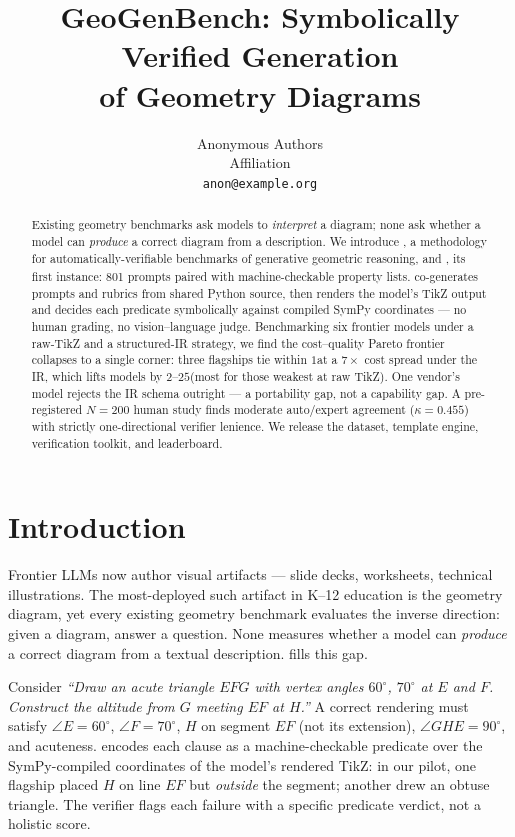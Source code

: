 \documentclass{article}
\title{GeoGenBench: Symbolically Verified Generation \\ of Geometry Diagrams}
\author{%
  Anonymous Authors\\
  Affiliation\\
  \texttt{anon@example.org}
}
\begin{document}
\maketitle

\begin{abstract}
Existing geometry benchmarks ask models to \emph{interpret} a diagram; none ask whether a model can \emph{produce} a correct diagram from a description.
We introduce \textbf{\GeoGen}, a methodology for automatically-verifiable benchmarks of generative geometric reasoning, and \textbf{\GeoGenBench}, its first instance: 801 prompts paired with machine-checkable property lists.
\GeoGen co-generates prompts and rubrics from shared Python source, then renders the model's TikZ output and decides each predicate symbolically against compiled SymPy coordinates --- no human grading, no vision--language judge.
Benchmarking six frontier models under a raw-TikZ and a structured-IR strategy, we find the cost--quality Pareto frontier collapses to a single corner: three flagships tie within $1$\pp at a $7\times$ cost spread under the IR, which lifts models by $2$--$25$\pp (most for those weakest at raw TikZ).
One vendor's model rejects the IR schema outright --- a portability gap, not a capability gap.
A pre-registered $N{=}200$ human study finds moderate auto/expert agreement ($\kappa{=}0.455$) with strictly one-directional verifier lenience.
We release the dataset, template engine, verification toolkit, and leaderboard.
\end{abstract}

\section{Introduction}
\label{sec:intro}

Frontier LLMs now author visual artifacts --- slide decks, worksheets, technical illustrations.
The most-deployed such artifact in K--12 education is the geometry diagram, yet every existing geometry benchmark evaluates the inverse direction: given a diagram, answer a question.
None measures whether a model can \emph{produce} a correct diagram from a textual description.
\GeoGenBench fills this gap.

Consider \textit{``Draw an acute triangle $EFG$ with vertex angles $60^\circ$, $70^\circ$ at $E$ and $F$. Construct the altitude from $G$ meeting $EF$ at $H$.''}
A correct rendering must satisfy $\angle E = 60^\circ$, $\angle F = 70^\circ$, $H$ on segment $EF$ (not its extension), $\angle GHE = 90^\circ$, and acuteness.
\GeoGenBench encodes each clause as a machine-checkable predicate over the SymPy-compiled coordinates of the model's rendered TikZ: in our pilot, one flagship placed $H$ on line $EF$ but \emph{outside} the segment; another drew an obtuse triangle.
The verifier flags each failure with a specific predicate verdict, not a holistic score.
\end{document}
